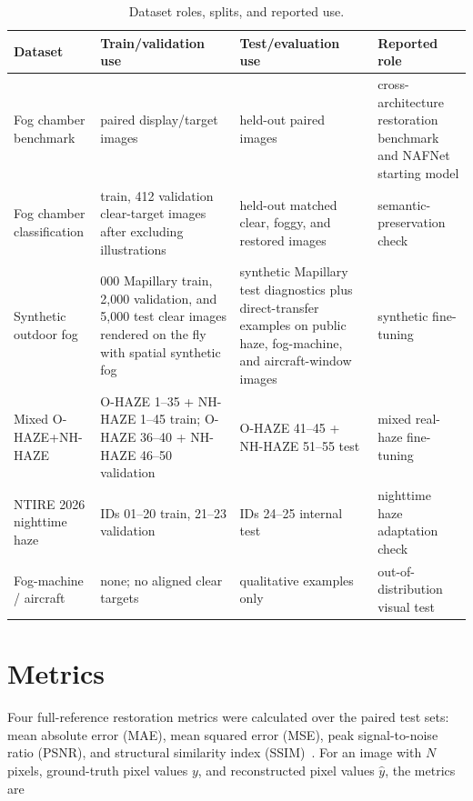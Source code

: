 \documentclass[9pt]{osa-supplemental-document}
\begin{document}
\begin{table}[H]
\centering
\footnotesize
\setlength{\tabcolsep}{4pt}
\renewcommand{\arraystretch}{1.15}
\caption{Dataset roles, splits, and reported use.}
\label{tabS:dataset_roles}
\begin{tabular}{@{}>{\raggedright\arraybackslash}p{}>{\raggedright\arraybackslash}p{}>{\raggedright\arraybackslash}p{}>{\raggedright\arraybackslash}p{}@{}}
\toprule
\textbf{Dataset} & \textbf{Train/validation use} & \textbf{Test/evaluation use} & \textbf{Reported role} \\
\midrule
Fog chamber benchmark & 4943 paired display/target images & 552 held-out paired images & cross-architecture restoration benchmark and NAFNet starting model \\
Fog chamber classification & 3708 train, 412 validation clear-target images after excluding illustrations & 460 held-out matched clear, foggy, and restored images & semantic-preservation check \\
Synthetic outdoor fog & 18{,}000 Mapillary train, 2{,}000 validation, and 5{,}000 test clear images rendered on the fly with spatial synthetic fog & synthetic Mapillary test diagnostics plus direct-transfer examples on public haze, fog-machine, and aircraft-window images & synthetic fine-tuning \\
Mixed O-HAZE+NH-HAZE & O-HAZE 1--35 + NH-HAZE 1--45 train; O-HAZE 36--40 + NH-HAZE 46--50 validation & O-HAZE 41--45 + NH-HAZE 51--55 test & mixed real-haze fine-tuning \\
NTIRE 2026 nighttime haze & IDs 01--20 train, 21--23 validation & IDs 24--25 internal test & nighttime haze adaptation check \\
Fog-machine / aircraft & none; no aligned clear targets & qualitative examples only & out-of-distribution visual test \\
\bottomrule
\end{tabular}
\end{table}
\FloatBarrier

\section{Metrics}
\label{secS:metrics}

Four full-reference restoration metrics were calculated over the paired test sets: mean absolute error (MAE), mean squared error (MSE), peak signal-to-noise ratio (PSNR), and structural similarity index (SSIM)~\cite{wang2004ssim}. For an image with $N$ pixels, ground-truth pixel values $y$, and reconstructed pixel values $\hat{y}$, the metrics are
\end{document}
